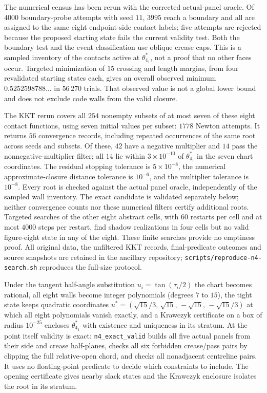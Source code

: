 The numerical census has been rerun with the corrected actual-panel oracle. Of $4000$ boundary-probe attempts with seed $11$, $3995$ reach a boundary and all are assigned to the same eight endpoint-side contact labels; five attempts are rejected because the proposed starting state fails the current validity test. Both the boundary test and the event classification use oblique crease caps. This is a sampled inventory of the contacts active at $\theta^*_{4_1}$, not a proof that no other faces occur. Targeted minimization of $15$ crossing and length margins, from four revalidated starting states each, gives an overall observed minimum $0.5252598788\ldots$ in $56\,270$ trials. That observed value is not a global lower bound and does not exclude code walls from the valid closure.

The KKT rerun covers all $254$ nonempty subsets of at most seven of these eight contact functions, using seven initial values per subset: $1778$ Newton attempts. It returns $56$ convergence records, including repeated occurrences of the same root across seeds and subsets. Of these, $42$ have a negative multiplier and $14$ pass the nonnegative-multiplier filter; all $14$ lie within $3\times10^{-10}$ of $\theta^*_{4_1}$ in the seven chart coordinates. The residual stopping tolerance is $5\times10^{-8}$, the numerical approximate-closure distance tolerance is $10^{-6}$, and the multiplier tolerance is $10^{-8}$. Every root is checked against the actual panel oracle, independently of the sampled wall inventory. The exact candidate is validated separately below; neither convergence counts nor these numerical filters certify additional roots. Targeted searches of the other eight abstract cells, with $60$ restarts per cell and at most $4000$ steps per restart, find shadow realizations in four cells but no valid figure-eight state in any of the eight. These finite searches provide no emptiness proof. All original data, the unfiltered KKT records, final-predicate outcomes and source snapshots are retained in the ancillary repository; \texttt{scripts/reproduce-n4-search.sh} reproduces the full-size protocol.

Under the tangent half-angle substitution $u_i=\tan(\tau_i/2)$ the chart becomes rational, all eight walls become integer polynomials (degrees $7$ to $15$), the tight state keeps quadratic coordinates $u^*=(\sqrt{15}/3,\,\sqrt{15},\,-\sqrt{15},\,-\sqrt{15}/3)$ at which all eight polynomials vanish exactly, and a Krawczyk certificate on a box of radius $10^{-25}$ encloses $\theta^*_{4_1}$ with existence and uniqueness in its stratum. At the point itself validity is exact: \texttt{n4\_exact\_valid} builds all five actual panels from their side and crease half-planes, checks all six forbidden crease/pass pairs by clipping the full relative-open chord, and checks all nonadjacent centreline pairs. It uses no floating-point predicate to decide which constraints to include. The opening certificate gives nearby slack states and the Krawczyk enclosure isolates the root in its stratum.

